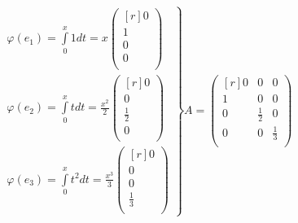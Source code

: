 $$
\left.
\begin{aligned}
\varphi (e_1)=\int\limits^x_0 1 dt=x
\left(
\begin{smallmatrix*}[r]
0\\ 1\\ 0\\ 0\\
\end{smallmatrix*}
\right) \\
\varphi (e_2)=\int\limits^x_0 t dt=\frac{x^2}{2}
\left(
\begin{smallmatrix*}[r]
0\\ 0\\ \frac{1}{2}\\ 0\\
\end{smallmatrix*}
\right) \\
\varphi (e_3)=\int\limits^x_0 t^2 dt=\frac{x^3}{3}
\left(
\begin{smallmatrix*}[r]
0\\ 0\\  0\\ \frac{1}{3}\\
\end{smallmatrix*}
\right) 
\end{aligned}
\right\}
A=
\begin{pmatrix*}[r]
 0 & 0 & 0\\
 1 & 0 & 0\\
 0 & \frac{1}{2} & 0\\
 0 & 0 & \frac{1}{3}\\
\end{pmatrix*}
$$